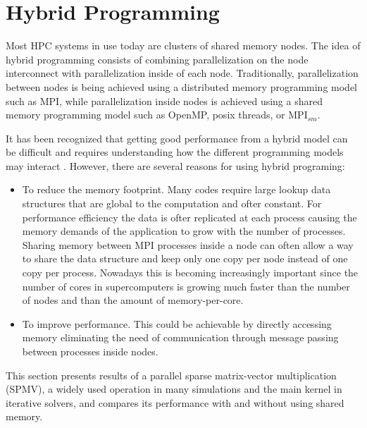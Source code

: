 \section{Hybrid Programming} %

Most HPC systems in use today are clusters of shared memory nodes. The idea of hybrid programming consists of combining parallelization on the node interconnect with parallelization inside of each node. Traditionally, parallelization between nodes is being achieved using a distributed memory programming model such as MPI, while parallelization inside nodes is achieved using a shared memory programming model such as OpenMP, posix threads, or MPI$_{sm}$. 

\medskip
It has been recognized that getting good performance from a hybrid model can be difficult and requires understanding how the different programming models may interact \cite{UsingAdvancedMPI}. However, there are several reasons for using hybrid programing:

\begin{itemize} 

\item To reduce the memory footprint. Many codes require large lookup data structures that are global to the computation and ofter constant. For performance efficiency the data is ofter replicated at each process causing the memory demands of the application to grow with the number of processes. Sharing memory between MPI processes inside a node can often allow a way to share the data structure and keep only one copy per node instead of one copy per process. Nowadays this is becoming increasingly important since the number of cores in supercomputers is growing much faster than the number of nodes and than the amount of memory-per-core.

\item To improve performance. This could be achievable by directly accessing memory eliminating the need of communication through message passing between processes inside nodes.


\end{itemize}


\medskip

This section presents results of a parallel sparse matrix-vector multiplication (SPMV), a widely used operation in many simulations and the main kernel in iterative solvers, and compares its performance with and without using shared memory.


\medskip


